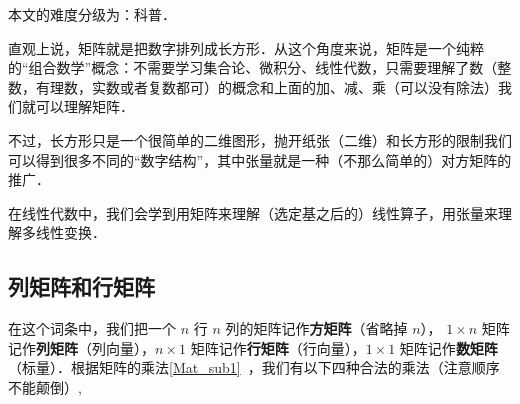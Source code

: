 
\begin{issues}
\issueDraft
\end{issues}



本文的难度分级为：科普．


直观上说，矩阵就是把数字排列成长方形．从这个角度来说，矩阵是一个纯粹的“组合数学”概念：不需要学习集合论、微积分、线性代数，只需要理解了数（整数，有理数，实数或者复数都可）的概念和上面的加、减、乘（可以没有除法）我们就可以理解矩阵．

不过，长方形只是一个很简单的二维图形，抛开纸张（二维）和长方形的限制我们可以得到很多不同的“数字结构”，其中张量就是一种（不那么简单的）对方矩阵的推广．

在线性代数中，我们会学到用矩阵来理解（选定基之后的）线性算子，用张量来理解多线性变换．

\subsection{列矩阵和行矩阵}
在这个词条中，我们把一个 $n$ 行 $n$ 列的矩阵记作\textbf{方矩阵}（省略掉 $n$）， $1 \times n$ 矩阵记作\textbf{列矩阵}（列向量），$n \times 1$ 矩阵记作\textbf{行矩阵}（行向量），$1 \times 1$ 矩阵记作\textbf{数矩阵}（标量）．根据矩阵的乘法\autoref{Mat_sub1}~，我们有以下四种合法的乘法（注意顺序不能颠倒）,

